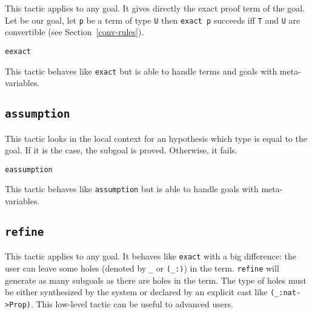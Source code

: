 This tactic applies to any goal. It gives directly the exact proof
term of the goal. Let {\T} be our goal, let {\tt p} be a term of type
{\tt U} then {\tt exact p} succeeds iff {\tt T} and {\tt U} are
convertible (see Section~\ref{conv-rules}).

\begin{ErrMsgs}
\item {}
\end{ErrMsgs}

\begin{Variants}
  \item \texttt{eexact \term}

    This tactic behaves like \texttt{exact} but is able to handle terms
    and goals with meta-variables.

\end{Variants}

\subsection{\tt assumption}

This tactic looks in the local context for an
hypothesis which type is equal to the goal.  If it is the case, the
subgoal is proved. Otherwise, it fails.

\begin{ErrMsgs}
\item  {}
\end{ErrMsgs}

\begin{Variants}
  \item \texttt{eassumption}

    This tactic behaves like \texttt{assumption} but is able to handle
    goals with meta-variables.

\end{Variants}

\subsection{\tt refine \term}
\label{refine}
\label{refine-example}

This tactic applies to any goal. It behaves like {\tt exact} with a big
difference: the user can leave some holes (denoted by \texttt{\_} or
{\tt (\_:\type)}) in the term. {\tt refine} will generate as
many subgoals as there are holes in the term. The type of holes must be
either synthesized by the system or declared by an
explicit cast like \verb|(_:nat->Prop)|. This low-level
tactic can be useful to advanced users.

